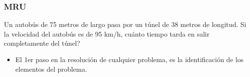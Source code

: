 \documentclass{beamer}
\begin{document}
\begin{frame}
\begin{center}
\end{center}
                                                              
                                                               
                                                               
                                                               
                                                               
\end{frame}

\begin{frame}
\frametitle{MRU}
% 
 
Un autob\'us de 75 metros de largo pasa por un t\'unel
de 38 metros de longitud. Si la velocidad del autob\'us
es de 95 km/h, cu\'anto tiempo tarda en salir
completamente del t\'unel?

 
\begin{itemize}                                                              

\item El 1er paso en la resoluci\'on de cualquier problema, es la
identificaci\'on de los elementos del problema.            
              
\end{itemize}

\end{frame}
\end{document}
